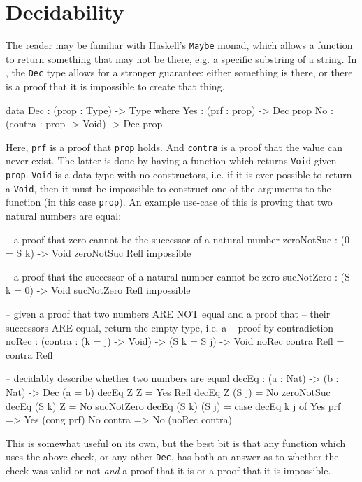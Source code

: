 \section{Decidability}\label{idris:dec}
	The reader may be familiar with Haskell's \texttt{Maybe} monad, which allows a function to return something that may not be there, e.g. a specific substring of a string. In \Idris, the \texttt{Dec} type allows for a stronger guarantee: either something is there, or there is a proof that it is impossible to create that thing.
	\begin{code}[caption={\texttt{Dec} as defined in the \Idris prelude \cite{brady_2017}}]
        data Dec : (prop : Type) -> Type where
             Yes : (prf : prop) -> Dec prop
             No  : (contra : prop -> Void) -> Dec prop
	\end{code}
    Here, \texttt{prf} is a proof that \texttt{prop} holds. And \texttt{contra} is a proof that the value can never exist. The latter is done by having a function which returns \texttt{Void} given \texttt{prop}. \texttt{Void} is a data type with no constructors, i.e. if it is ever possible to return a \texttt{Void}, then it must be impossible to construct one of the arguments to the function (in this case \texttt{prop}). An example use-case of this is proving that two natural numbers are equal:
	\begin{code}[caption={Proving the equality between natural numbers \cite{brady_2017}},label={lst:decEq}]
    -- a proof that zero cannot be the successor of a natural number
    zeroNotSuc : (0 = S k) -> Void
    zeroNotSuc Refl impossible
    
    -- a proof that the successor of a natural number cannot be zero
    sucNotZero : (S k = 0) -> Void
    sucNotZero Refl impossible
    
    -- given a proof that two numbers ARE NOT equal and a proof that
    -- their successors ARE equal, return the empty type, i.e. a
    -- proof by contradiction
    noRec : (contra : (k = j) -> Void) -> (S k = S j) -> Void
    noRec contra Refl = contra Refl

    -- decidably describe whether two numbers are equal
    decEq : (a : Nat) -> (b : Nat) -> Dec (a = b)
    decEq Z Z = Yes Refl
    decEq Z (S j) = No zeroNotSuc
    decEq (S k) Z = No sucNotZero
    decEq (S k) (S j) = case decEq k j of
                            Yes prf => Yes (cong prf)
                            No contra => No (noRec contra)
	\end{code}
    This is somewhat useful on its own, but the best bit is that any function which uses the above check, or any other \texttt{Dec}, has both an answer as to whether the check was valid or not \textit{and} a proof that it is or a proof that it is impossible.

